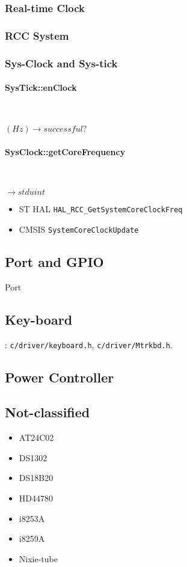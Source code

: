 \subsubsection{Real-time Clock}

\subsubsection{RCC System}

\subsubsection{Sys-Clock and Sys-tick}

\paragraph{SysTick::enClock} \



$(Hz) \rightarrow successful?$

\paragraph{SysClock::getCoreFrequency} \


$\rightarrow stduint$

\begin{itemize}
\item ST HAL \verb`HAL_RCC_GetSystemCoreClockFreq`
\item CMSIS \verb`SystemCoreClockUpdate`
\end{itemize}



\subsection{Port and GPIO}
{Port}

\subsection{Key-board}
: \verb`c/driver/keyboard.h`, \verb`c/driver/Mtrkbd.h`.

\subsection{Power Controller}

\subsection{Not-classified}
\begin{itemize}
\item AT24C02
\item DS1302
\item DS18B20
\item HD44780
\item i8253A
\item i8259A
\item Nixie-tube
\end{itemize}


